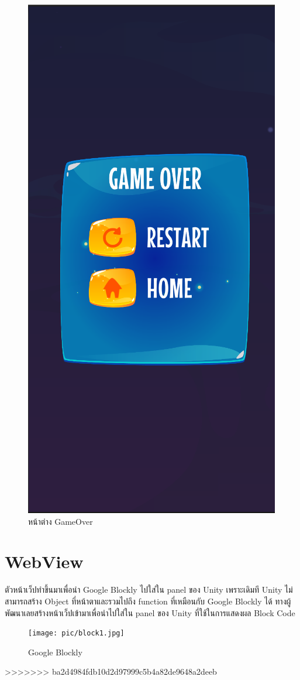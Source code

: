 \begin{figure}
\begin{center}
\includegraphics[scale = 0.4]{pic/gameover.PNG}
\end{center}
\caption[Poem]{หน้าต่าง GameOver}
\label{lose}
\end{figure}



\section{WebView}
ตัวหน้าเว็ปทำขึ้นมาเพื่อนำ Google Blockly ไปใส่ใน panel ของ Unity เพราะเดิมที Unity ไม่สามารถสร้าง Object ที่หน้าตาและรวมไปถึง function ที่เหมือนกับ Google Blockly ได้ ทางผู้พัฒนาเลยสร้างหน้าเว็ปเข้ามาเพื่อนำไปใส่ใน 
panel ของ Unity ที่ใช้ในการแสดงผล Block Code


\begin{figure}
\begin{center}
\texttt{[image: pic/block1.jpg]}
\end{center}
\caption[Poem]{Google Blockly}
\label{block}
\end{figure}
>>>>>>> ba2d4984fdb10d2d97999c5b4a82de9648a2deeb
